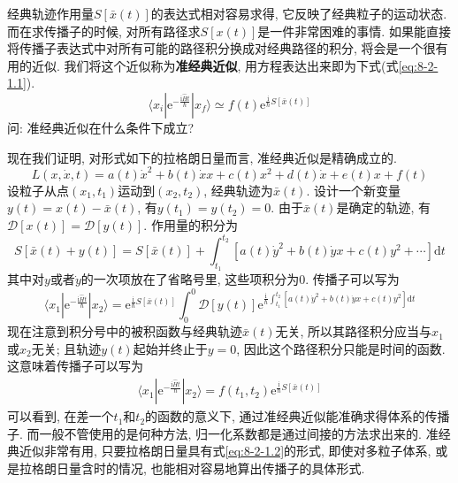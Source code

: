         经典轨迹作用量$S[\bar x(t)]$的表达式相对容易求得, 它反映了经典粒子的运动状态. 而在求传播子的时候, 对所有路径求$S[x(t)]$是一件非常困难的事情. 如果能直接将传播子表达式中对所有可能的路径积分换成对经典路径的积分, 将会是一个很有用的近似. 我们将这个近似称为\textbf{准经典近似}, 用方程表达出来即为下式(式\ref{eq:8-2-1.1}). 
        \begin{equation}\label{eq:8-2-1.1}
            \langle x_i | \mathrm{e}^{-\frac {\mathrm{i}\hat{H}t}{\hbar}} | x_f \rangle \simeq f(t) \mathrm{e}^{ \frac{\mathrm{i}}{\hbar} S[\bar x(t)] } 
        \end{equation}
        问: 准经典近似在什么条件下成立?

        \splitline

        现在我们证明, 对形式如下的拉格朗日量而言, 准经典近似是精确成立的. 
        \begin{equation}\label{eq:8-2-1.2}
            L(x, \dot x, t) = a(t)\dot x^2 + b(t) \dot x x + c(t) x^2 + d(t) \dot x + e(t) x + f(t)
        \end{equation}
        设粒子从点$(x_1, t_1)$运动到$(x_2, t_2)$, 经典轨迹为$\bar x(t)$. 设计一个新变量$y(t) = x(t) - \bar x(t)$, 有$y(t_1) = y(t_2) = 0$. 由于$\bar x(t)$是确定的轨迹, 有$\mathcal{D}[x(t)] = \mathcal{D}[y(t)]$. 作用量的积分为
        \begin{equation}
            S[\bar x(t) + y(t)] = S[\bar x(t)] + \int_{t_1}^{t_2} [a(t)\dot y^2 + b(t) \dot y x + c(t) y^2 + \cdots] \mathrm{d}t
        \end{equation}
        其中对$y$或者$\dot y$的一次项放在了省略号里, 这些项积分为0. 传播子可以写为
        \begin{equation}
            \langle x_1 | \mathrm{e}^{-\frac {\mathrm{i}\hat{H}t}{\hbar}} | x_2 \rangle = \mathrm{e}^{ \frac{\mathrm{i}}{\hbar} S[\bar x(t)] } \int_0^0 \mathcal{D}[y(t)] \mathrm{e}^{ \frac{\mathrm{i}}{\hbar} \int_{t_1}^{t_2} [a(t)\dot y^2 + b(t) \dot y x + c(t) y^2] \mathrm{d}t }
        \end{equation}
        现在注意到积分号中的被积函数与经典轨迹$\bar x(t)$无关, 所以其路径积分应当与$x_1$或$x_2$无关; 且轨迹$y(t)$起始并终止于$y=0$, 因此这个路径积分只能是时间的函数. 这意味着传播子可以写为
        \begin{equation}\begin{aligned}
            \langle x_1 | \mathrm{e}^{-\frac {\mathrm{i}\hat{H}t}{\hbar}} | x_2 \rangle = f(t_1, t_2) \mathrm{e}^{ \frac{\mathrm{i}}{\hbar} S[\bar x(t)] } 
        \end{aligned}\end{equation}
        可以看到, 在差一个$t_1$和$t_2$的函数的意义下, 通过准经典近似能准确求得体系的传播子. 而一般不管使用的是何种方法, 归一化系数都是通过间接的方法求出来的. 准经典近似非常有用, 只要拉格朗日量具有式\ref{eq:8-2-1.2}的形式, 即使对多粒子体系, 或是拉格朗日量含时的情况, 也能相对容易地算出传播子的具体形式. 

